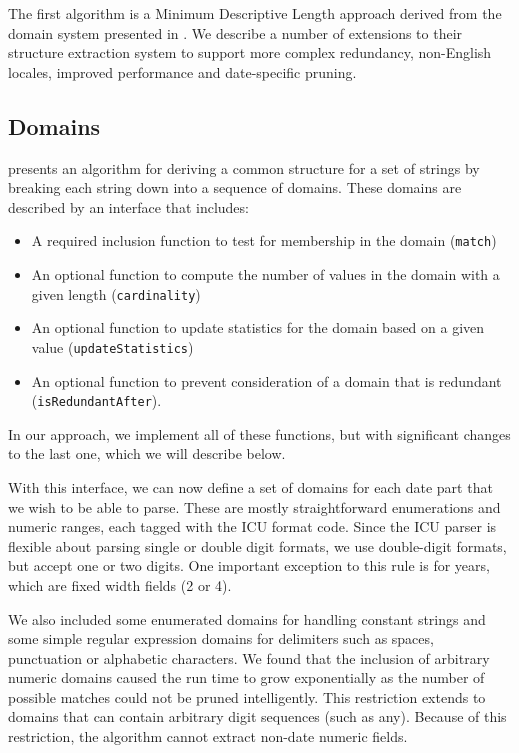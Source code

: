 The first algorithm is a Minimum Descriptive Length \cite{mdl} approach derived from the domain system presented in \cite{PottersWheel}. We describe a number of extensions to their structure extraction system to support more complex redundancy, non-English locales, improved performance and date-specific pruning.

\subsection{Domains}
\cite{PottersWheel} presents an algorithm for deriving a common structure for a set of strings by breaking each string down into a sequence of domains. These domains are described by an interface that includes:
\begin{itemize}
\item A required inclusion function to test for membership in the domain (\texttt{match})
\item An optional function to compute the number of values in the domain with a given length (\texttt{cardinality})
\item An optional function to update statistics for the domain based on a given value (\texttt{updateStatistics})
\item An optional function to prevent consideration of a domain that is redundant (\texttt{isRedundantAfter}).
\end{itemize}

In our approach, we implement all of these functions, but with significant changes to the last one, which we will describe below.

With this interface, we can now define a set of domains for each date part that we wish to be able to parse. These are mostly straightforward enumerations and numeric ranges, each tagged with the ICU format code. Since the ICU parser is flexible about parsing single or double digit formats, we use double-digit formats, but accept one or two digits. One important exception to this rule is for years, which are fixed width fields (2 or 4).

We also included some enumerated domains for handling constant strings and some simple regular expression domains for delimiters such as spaces, punctuation or alphabetic characters. We found that the inclusion of arbitrary numeric domains caused the run time to grow exponentially as the number of possible matches could not be pruned intelligently. This restriction extends to domains that can contain arbitrary digit sequences (such as any). Because of this restriction, the algorithm cannot extract non-date numeric fields.


